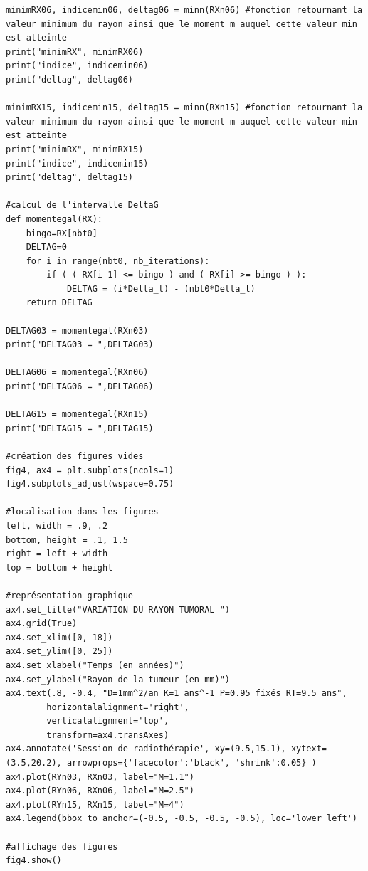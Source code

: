 \documentclass[12pt,a4paper]{article}
\begin{document}
\begin{lstlisting}[style=stylepython]
minimRX06, indicemin06, deltag06 = minn(RXn06) #fonction retournant la valeur minimum du rayon ainsi que le moment m auquel cette valeur min est atteinte
print("minimRX", minimRX06)
print("indice", indicemin06)
print("deltag", deltag06)

minimRX15, indicemin15, deltag15 = minn(RXn15) #fonction retournant la valeur minimum du rayon ainsi que le moment m auquel cette valeur min est atteinte
print("minimRX", minimRX15)
print("indice", indicemin15)
print("deltag", deltag15)

#calcul de l'intervalle DeltaG
def momentegal(RX):
    bingo=RX[nbt0]
    DELTAG=0
    for i in range(nbt0, nb_iterations):
        if ( ( RX[i-1] <= bingo ) and ( RX[i] >= bingo ) ):
            DELTAG = (i*Delta_t) - (nbt0*Delta_t) 
    return DELTAG

DELTAG03 = momentegal(RXn03)
print("DELTAG03 = ",DELTAG03)

DELTAG06 = momentegal(RXn06)
print("DELTAG06 = ",DELTAG06)

DELTAG15 = momentegal(RXn15)
print("DELTAG15 = ",DELTAG15)

#création des figures vides 
fig4, ax4 = plt.subplots(ncols=1)
fig4.subplots_adjust(wspace=0.75)

#localisation dans les figures
left, width = .9, .2
bottom, height = .1, 1.5
right = left + width
top = bottom + height

#représentation graphique 
ax4.set_title("VARIATION DU RAYON TUMORAL ")
ax4.grid(True)
ax4.set_xlim([0, 18])
ax4.set_ylim([0, 25])
ax4.set_xlabel("Temps (en années)")
ax4.set_ylabel("Rayon de la tumeur (en mm)")
ax4.text(.8, -0.4, "D=1mm^2/an K=1 ans^-1 P=0.95 fixés RT=9.5 ans",
        horizontalalignment='right',
        verticalalignment='top',
        transform=ax4.transAxes)
ax4.annotate('Session de radiothérapie', xy=(9.5,15.1), xytext=(3.5,20.2), arrowprops={'facecolor':'black', 'shrink':0.05} )
ax4.plot(RYn03, RXn03, label="M=1.1")
ax4.plot(RYn06, RXn06, label="M=2.5")
ax4.plot(RYn15, RXn15, label="M=4")
ax4.legend(bbox_to_anchor=(-0.5, -0.5, -0.5, -0.5), loc='lower left')

#affichage des figures 
fig4.show()
\end{lstlisting}
\\
\newpage
\end{document}
